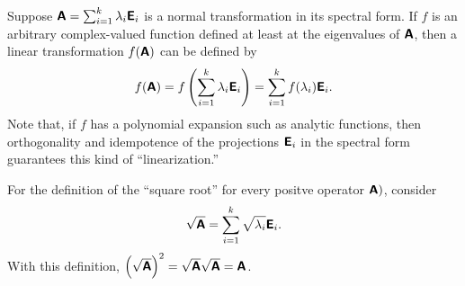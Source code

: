 Suppose $\textsf{\textbf{A}}=\sum_{i=1}^k \lambda_i  \textsf{\textbf{E}}_i $ is a normal transformation
in its spectral form.
If $f$ is an arbitrary complex-valued function defined at least at the eigenvalues of $\textsf{\textbf{A}}$,
then a linear transformation  $f(\textsf{\textbf{A}})$ can be defined by
\begin{equation}
f(\textsf{\textbf{A}})=
f\left(\sum_{i=1}^k \lambda_i \textsf{\textbf{E}}_i\right)
=\sum_{i=1}^k f(\lambda_i)  \textsf{\textbf{E}}_i
 .
\end{equation}
Note that, if $f$ has a polynomial expansion such as analytic functions, then orthogonality and idempotence
of the projections $\textsf{\textbf{E}}_i $ in the spectral form guarantees this kind of ``linearization.''

{
\color{blue}
\bexample
For the definition of the ``square root''
for every positve operator $\textsf{\textbf{A}})$, consider
\begin{equation}
\sqrt{\textsf{\textbf{A}}}=\sum_{i=1}^k \sqrt{\lambda_i}  \textsf{\textbf{E}}_i.
\end{equation}
With this definition,
$\left(\sqrt{\textsf{\textbf{A}}}\right)^2=
\sqrt{\textsf{\textbf{A}}}\sqrt{\textsf{\textbf{A}}}= {\textsf{\textbf{A}}}$.

}
